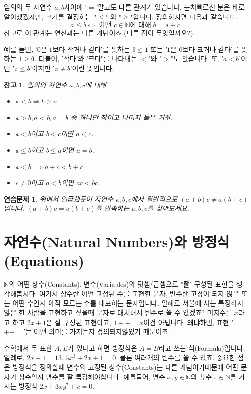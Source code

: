 \documentclass[a4paper, 11pt]{report}
\renewcommand{\<}{\langle}
\renewcommand{\>}{\rangle}
\newtheorem{remark}[thm]{참고}
\newtheorem{exercise}[thm]{연습문제}
\begin{document}
임의의 두 자연수 $a, b$사이에 '$=$'말고도 다른 관계가 있습니다.
눈치빠르신 분은 바로 알아챘겠지만, 크기를 결정하는 "$\le$" 와 "$\ge$"입니다. 정의하자면 다음과 같습니다:
$$
a \le b \iff \text{ 어떤 } c \in \mathbb{N} \text{에 대해 } b = a + c.
$$
참고로 이 관계는 연산과는 다른 개념이죠 (다른 점이 무엇일까요?).

예를 들면, '$0$은 $1$보다 작거나 같다'를 뜻하는 $0 \le 1$ 또는 '$1$은 $0$보다 크거나 같다'를 뜻하는 
$1 \ge 0$. 더불어, '작다'와 '크다"를 나타내는 $<$"와 "$>$"도 있습니다. 
또, '$a < b$'이면 '$a \le b$'이지만 '$a\neq b$'이란 뜻입니다.
\begin{remark}\label{remark:2_1_5}
  임의의 자연수 $a, b, c$에 대해 
  \begin{itemize}
    \item $a < b \iff b > a$.
    \item $a > b, a < b, a = b$ 중 하나만 참이고 나머지 둘은 거짓.
    \item $a < b$이고 $b < c$이면 $a < c$.
    \item $a \le b$이고 $b \le a$이면 $a = b$.
    \item $a < b \implies a + c < b + c$.
    \item $c \neq 0$이고 $a < b$이면 $ ac < bc$.
  \end{itemize}
\end{remark}
\begin{exercise}
  위에서 언급했듯이 자연수 $a, b, c$에서 일반적으로 $(a+b)c \neq a(b+c)$입니다. $(a+b)c = a(b+c)$를 
  만족하는 $a, b, c$를 찾아보세요. 
\end{exercise}

\section{자연수(Natural Numbers)와 방정식(Equations)}

$\mathbb{N}$의 어떤 상수(Constants), 변수(Variables)와 덧셈/곱셈으로 
"\textbf{잘}" 구성된 표현을 생각해봅시다. 여기서 상수란 어떤 고정된 수를 표현한 문자, 변수란 
고정이 되지 않은 또는 어떤 수인지 아직 모르는 수를 대표하는 문자입니다. 일례로 서울에 사는 특정하지 
않은 한 사람을 표현하고 싶을때 문자로 대치해서 변수로 쓸 수 있겠죠? 
미지수를 $x$라고 하고 $2x + 1$은 잘 구성된 표현이고, $1++=x$이건 아닙니다. 
왜냐하면, 표현 '$++=$'는 어떤 의미를 가지는지 정의되지않았기 때문이죠.

수학에서 두 표현 $A, B$가 있다고 하면 방정식은 $A = B$라고 쓰는 식(Formula)입니다. 
일례로, $2x + 1 = 13$, $5x^3 + 2x + 1 = 0$. 물론 여러개의 변수를 쓸 수 있죠. 
중요한 점은 방정식을 정의할때 변수와 고정된 상수(Constants)는 다른 개념이기때문에 
어떤 문자가 상수인지 변수를 잘 특정해야합니다. 예를들어, 변수 $x, y \in \mathbb{N}$와 
상수 $c \in \mathbb{N}$를 가지는 방정식 $2x + 3xy^2 + c = 0$.
\end{document}
